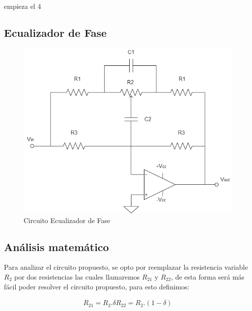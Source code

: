 empieza el 4

\subsection{Ecualizador de Fase}


\begin{figure}[H]
	\centering
	\includegraphics[scale=1]{../Ejercicio4-EcualizadorDeFase/Informe/Ecualizador de Fase.png}
	\caption{Circuito Ecualizador de Fase}
\end{figure}


\subsection{Análisis matemático}

Para analizar el circuito propuesto, se opto por reemplazar la resistencia variable $R_2$ por dos resistencias las cuales llamaremos $R_{21}$ y $R_{22}$, de esta forma será más fácil poder resolver el circuito propuesto, para esto definimos:

\begin{align}

	\begin{equation}
		R_{21} = R_2 . \delta
	\end{equation}

	\begin{equation}
		R_{22}= R_2 . (1 - \delta)
	\end{equation}

\end{align}


